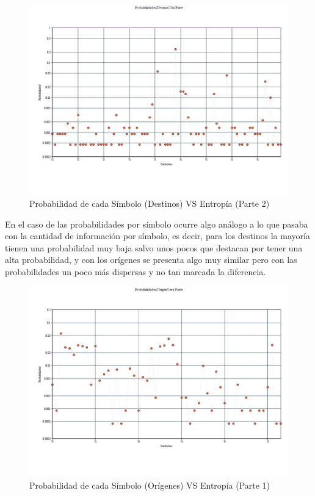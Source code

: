 \begin{figure}[H]
  \centering
    \includegraphics[scale=0.45]{imagenes/graficos/Probabilidades/02destino2daParte.jpg}
  \caption{Probabilidad de cada Símbolo (Destinos) VS Entropía (Parte 2)}
  \label{fig:6}
\end{figure}

\newpage

En el caso de las probabilidades por símbolo ocurre algo análogo a lo que pasaba con la cantidad de información por símbolo, es decir, para los destinos la mayoría tienen una probabilidad muy baja salvo unos pocos que destacan por tener una alta probabilidad, y con los orígenes se presenta algo muy similar pero con las probabilidades un poco más dispersas y no tan marcada la diferencia.

\begin{figure}[H]
  \centering
    \includegraphics[scale=0.45]{imagenes/graficos/Probabilidades/02origen1eraParte.jpg}
  \caption{Probabilidad de cada Símbolo (Orígenes) VS Entropía (Parte 1)}
  \label{fig:7}
\end{figure}

